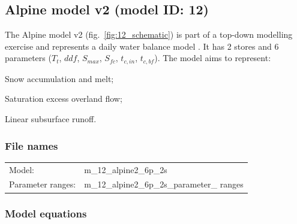 \subsection{Alpine model v2 (model ID: 12)}
The Alpine model v2 (fig.~\ref{fig:12_schematic}) is part of a top-down modelling exercise and represents a daily water balance model \citep{Eder2003}. It has 2 stores and 6 parameters ($T_t$, $ddf$, $S_{max}$, $S_{fc}$, $t_{c,in}$, $t_{c,bf}$). The model aims to represent:

\begin{itemizecompact}
\item Snow accumulation and melt;
\item Saturation excess overland flow;
\item Linear subsurface runoff.
\end{itemizecompact}

\subsubsection{File names}
\begin{tabular}{@{}ll}
Model: &m\_12\_alpine2\_6p\_2s \\
Parameter ranges: &m\_12\_alpine2\_6p\_2s\_parameter\_ ranges \\
\end{tabular}

\subsubsection{Model equations}


